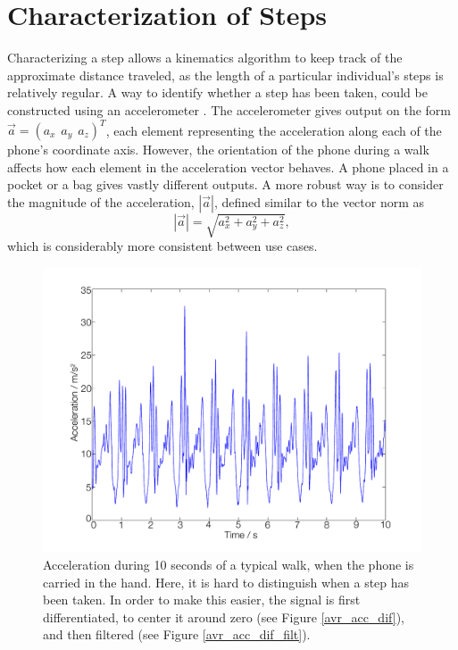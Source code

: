 \documentclass{LTHthesis}
\begin{document}
\section{Characterization of Steps}
\label{sec:step}
%
Characterizing a step allows a kinematics algorithm to keep track of the approximate distance traveled, as the length of a particular individual's steps is relatively regular. A way to identify whether a step has been taken, could be constructed using an accelerometer \cite{step_count}. The accelerometer gives output on the form $\vec a = (a_x \hspace{5pt} a_y \hspace{5pt} a_z)^T$, each element representing the acceleration along each of the phone's coordinate axis. However, the orientation of the phone during a walk affects how each element in the acceleration vector behaves. A phone placed in a pocket or a bag gives vastly different outputs. A more robust way is to consider the magnitude of the acceleration, $|\vec a|$, defined similar to the vector norm as 
%
\begin{equation}
|\vec a| = \sqrt{a_x^2+a_y^2+a_z^2},
\end{equation}
%
which is considerably more consistent between use cases.
%
\begin{figure}[!hbt]

\includegraphics[width=1\textwidth ]{images/kinematic/avr_acc}
\caption{Acceleration during 10 seconds of a typical walk, when the phone is carried in the hand. Here, it is hard to distinguish when a step has been taken. In order to make this easier, the signal is first differentiated, to center it around zero (see Figure \ref{avr_acc_dif}), and then filtered (see Figure \ref{avr_acc_dif_filt}).} \label{avr_acc}
\end{figure}
\end{document}
